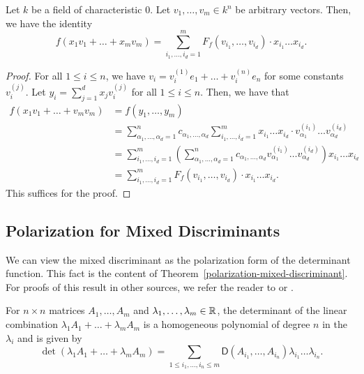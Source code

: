 \documentclass{puthesis-UG}
\begin{document}
\begin{thm} \label{polariziation-identity}
	Let $k$ be a field of characteristic $0$. Let $v_1, \ldots, v_m \in k^n$ be arbitrary vectors. Then, we have the identity
	\[
		f(x_1 v_1 + \ldots + x_m v_m ) = \sum_{i_1, \ldots, i_d = 1}^m F_f(v_{i_1}, \ldots, v_{i_d}) \cdot x_{i_1} \ldots x_{i_d}.
	\]
\end{thm}
\begin{proof}
	For all $1 \leq i \leq n$, we have $v_i = v_i^{(1)} e_1 + \ldots + v_i^{(n)} e_n$ for some constants $v_i^{(j)}$. Let $y_i = \sum_{j = 1}^d x_j v_i^{(j)}$ for all $1 \leq i \leq n$. Then, we have that 
	\begin{align*}
		f(x_1 v_1 + \ldots + v_m v_m) & = f(y_1, \ldots, y_m) \\
		& = \sum_{\alpha_1, \ldots, \alpha_d = 1}^n c_{\alpha_1, \ldots, \alpha_d} \sum_{i_1, \ldots, i_d = 1}^m x_{i_1} \ldots x_{i_d} \cdot v_{\alpha_1}^{(i_1)} \ldots v_{\alpha_d}^{(i_d)} \\
		& = \sum_{i_1, \ldots, i_d = 1}^m \left ( \sum_{\alpha_1, \ldots, \alpha_d = 1}^n c_{\alpha_1, \ldots, \alpha_d} v_{\alpha_1}^{(i_1)} \ldots v_{\alpha_d}^{(i_d)}\right ) x_{i_1} \ldots x_{i_d} \\
		& = \sum_{i_1, \ldots, i_d = 1}^m F_f(v_{i_1}, \ldots, v_{i_d}) \cdot x_{i_1} \ldots x_{i_d}.
	\end{align*}
	This suffices for the proof. 
\end{proof}

\subsection{Polarization for Mixed Discriminants}

We can view the mixed discriminant as the polarization form of the determinant function. This fact is the content of Theorem~\ref{polarization-mixed-discriminant}. For proofs of this result in other sources, we refer the reader to \cite{Zhao2015-kf} or \cite{schneider_2013}. 

\begin{thm} \label{polarization-mixed-discriminant}
	For $n \times n$ matrices $A_1, \ldots, A_m$ and $\lambda_1, \ldots, \lambda_m \in \mathbb{R}$, the determinant of the linear combination $\lambda_1 A_1 + \ldots + \lambda_m A_m$ is a homogeneous polynomial of degree $n$ in the $\lambda_i$ and is given by 
	\[
		\det (\lambda_1 A_1 + \ldots + \lambda_m A_m) = \sum_{1 \leq i_1, \ldots, i_n \leq m} \mathsf{D}(A_{i_1}, \ldots, A_{i_n}) \lambda_{i_1} \ldots \lambda_{i_n}. 
	\]
\end{thm}
\end{document}
